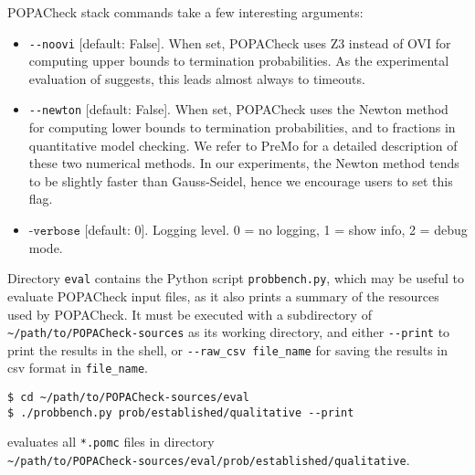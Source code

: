 \documentclass[9pt,a4paper]{article}
\begin{document}
POPACheck stack commands take a few interesting arguments:
\begin{itemize}
    \item \verb|--noovi| [default: False]. When set, POPACheck uses Z3 instead of OVI for computing upper bounds to termination probabilities. As the experimental evaluation of \cite{POPACheck} suggests, this leads almost always to timeouts.
    \item \verb|--newton| [default: False]. When set, POPACheck uses the Newton method for computing lower bounds to termination probabilities, and to fractions in quantitative model checking. We refer to PreMo \cite{WojtczakE07,Wojtczak09} for a detailed description of these two numerical methods. In our experiments, the Newton method tends to be slightly faster than Gauss-Seidel, hence we encourage users to set this flag.
    \item $\texttt{-verbose}$ [default: 0]. Logging level. 0 = no logging, 1 = show info, 2 = debug mode.
\end{itemize}

Directory \verb|eval| contains the Python script \verb|probbench.py|,
which may be useful to evaluate POPACheck input files, as it also prints
a summary of the resources used by POPACheck.
It must be executed with a subdirectory of \verb|~/path/to/POPACheck-sources| as its working directory, and either \verb|--print| to print the results in the shell, or \verb|--raw_csv file_name| for saving the results in csv format in \verb|file_name|.

\begin{verbatim}
$ cd ~/path/to/POPACheck-sources/eval
$ ./probbench.py prob/established/qualitative --print
\end{verbatim}
evaluates all \verb|*.pomc| files in directory \\ \verb|~/path/to/POPACheck-sources/eval/prob/established/qualitative|.
\end{document}
